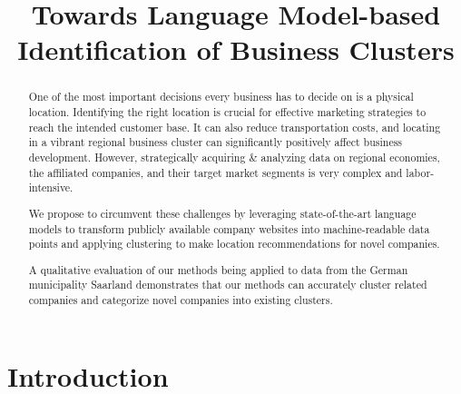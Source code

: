 \documentclass[conference]{IEEEtran}
\begin{document}
\title{Towards Language Model-based Identification of Business Clusters}

\author{
\and
{}
\and
{}
\and
{}
\and
{}
}

\maketitle

\begin{abstract}
	One of the most important decisions every business has to decide on is a physical location. Identifying the right location is crucial for effective marketing strategies to reach the intended customer base. It can also reduce transportation costs, and locating in a vibrant regional business cluster can significantly positively affect business development.
	However, strategically acquiring \& analyzing data on regional economies, the affiliated companies, and their target market segments is very complex and labor-intensive. 
	
	We propose to circumvent these challenges by leveraging state-of-the-art language models to transform publicly available company websites into machine-readable data points and applying clustering to make location recommendations for novel companies.
	
	A qualitative evaluation of our methods being applied to data from the German municipality Saarland demonstrates that our methods can accurately cluster related companies and categorize novel companies into existing clusters.
\end{abstract}


\section{Introduction}
\end{document}
